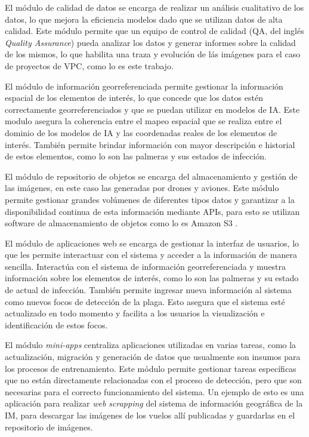 El módulo de calidad de datos se encarga de realizar un análisis cualitativo de los datos, lo que mejora la eficiencia modelos dado que se utilizan datos de alta calidad. Este módulo permite que un equipo de control de calidad (QA, del inglés \textit{Quality Assurance}) pueda analizar los datos y generar informes sobre la calidad de los mismos, lo que habilita una traza y evolución de lás imágenes para el caso de proyectos de VPC, como lo es este trabajo.

El módulo de información georreferenciada permite gestionar la información espacial de los elementos de interés, lo que concede que los datos estén correctamente georreferenciados y que se puedan utilizar en modelos de IA. Este modulo asegura la coherencia entre el mapeo espacial que se realiza entre el dominio de los modelos de IA y las coordenadas reales de los elementos de interés. También permite brindar información con mayor descripción e historial de estos elementos, como lo son las palmeras y sus estados de infección.

El módulo de repositorio de objetos se encarga del almacenamiento y gestión de las imágenes, en este caso las generadas por drones y aviones. Este módulo permite gestionar grandes volúmenes de diferentes tipos datos y garantizar a la disponibilidad continua de esta información mediante APIs, para esto se utilizan software de almacenamiento de objetos como lo es Amazon S3 \citep{amazon_web_services_aws_nodate}.

El módulo de aplicaciones web se encarga de gestionar la interfaz de usuarios, lo que les permite interactuar con el sistema y acceder a la información de manera sencilla. Interactúa con el sistema de información georreferenciada y muestra información sobre los elementos de interés, como lo son las palmeras y su estado de actual de infección. También permite ingresar nueva información al sistema como nuevos focos de detección de la plaga. Esto asegura que el sistema esté actualizado en todo momento y facilita a los usuarios la visualización e identificación de estos focos.

El módulo \textit{mini-apps} centraliza aplicaciones utilizadas en varias tareas, como la actualización, migración y generación de datos que usualmente son insumos para los procesos de entrenamiento. Este módulo permite gestionar tareas específicas que no están directamente relacionadas con el proceso de detección, pero que son necesarias para el correcto funcionamiento del sistema. Un ejemplo de esto es una aplicación para realizar \textit{web scrapping} del sistema de información geográfica de la IM, para descargar las imágenes de los vuelos allí publicadas y guardarlas en el repositorio de imágenes.

